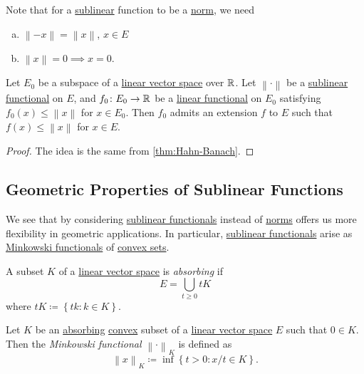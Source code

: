 \begin{remark}
	Note that for a \hyperref[def:sublinear]{sublinear} function to be a \hyperref[def:norm]{norm}, we need
	\begin{enumerate}[(a)]
		\item \(\left\lVert -x\right\rVert =\left\lVert x\right\rVert \), \(x\in E\)
		\item \(\left\lVert x\right\rVert = 0 \implies x = 0\).
	\end{enumerate}
\end{remark}

\begin{theorem}\label{thm:hahn-Banach-Sublinear}
	Let \(E_0\) be a subspace of a \hyperref[def:linear-vector-space]{linear vector space} over \(\mathbb{\MakeUppercase{r}} \). Let \(\left\lVert \cdot\right\rVert \) be a \hyperref[def:sublinear]{sublinear functional} on \(E\), and \(f_0 \colon E_0\to \mathbb{\MakeUppercase{r}} \) be a \hyperref[def:linear-functional]{linear functional} on \(E_0\) satisfying \(f_0(x) \leq \left\lVert x\right\rVert \) for \(x\in E_0\). Then \(f_0\) admits an extension \(f\) to \(E\) such that \(f(x) \leq \left\lVert x\right\rVert \) for \(x\in E\).
\end{theorem}
\begin{proof}
	The idea is the same from \autoref{thm:Hahn-Banach}.
\end{proof}

\subsection{Geometric Properties of Sublinear Functions}
We see that by considering \hyperref[def:sublinear]{sublinear functionals} instead of \hyperref[def:norm]{norms} offers us more flexibility in geometric applications. In particular, \hyperref[def:sublinear]{sublinear functionals} arise as \hyperref[def:Minkowski-functional]{Minkowski functionals} of \hyperref[def:convex-set]{convex sets}.
\begin{definition}[Absorbing]\label{def:absorbing}
	A subset \(K\) of a \hyperref[def:linear-vector-space]{linear vector space} is \emph{absorbing} if
	\[
		E = \bigcup\limits_{t \geq 0} tK
	\]
	where \(tK \coloneqq \left\{ tk \colon k\in K \right\} \).
\end{definition}

\begin{definition}\label{def:Minkowski-functional}
	Let \(K\) be an \hyperref[def:absorbing]{absorbing} \hyperref[def:convex-set]{convex} subset of a \hyperref[def:linear-vector-space]{linear vector space} \(E\) such that \(0\in K\). Then the \emph{Minkowski functional} \(\left\lVert \cdot\right\rVert _K\) is defined as
	\[
		\left\lVert x\right\rVert _K \coloneqq \inf \left\{ t > 0 \colon x / t \in K \right\}.
	\]
\end{definition}

